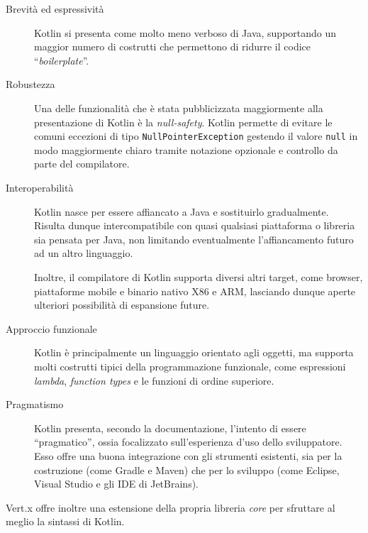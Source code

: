       \begin{description}
        \item[Brevità ed espressività]
          Kotlin si presenta come molto meno verboso di Java, supportando un maggior numero di costrutti che permettono di ridurre il codice ``\emph{boilerplate}''.

        \item[Robustezza]
          Una delle funzionalità che è stata pubblicizzata maggiormente alla presentazione di Kotlin è la \emph{null-safety}.
          Kotlin permette di evitare le comuni eccezioni di tipo \texttt{NullPointerException} gestendo il valore \texttt{null} in modo maggiormente chiaro tramite notazione opzionale e controllo da parte del compilatore.

        \item[Interoperabilità]
          Kotlin nasce per essere affiancato a Java e sostituirlo gradualmente.
          Risulta dunque intercompatibile con quasi qualsiasi piattaforma o libreria sia pensata per Java, non limitando eventualmente l'affiancamento futuro ad un altro linguaggio.

          Inoltre, il compilatore di Kotlin supporta diversi altri target, come browser, piattaforme mobile e binario nativo X86 e ARM, lasciando dunque aperte ulteriori possibilità di espansione future.

        \item[Approccio funzionale]
          Kotlin è principalmente un linguaggio orientato agli oggetti, ma supporta molti costrutti tipici della programmazione funzionale, come espressioni \emph{lambda}, \emph{function types} e le funzioni di ordine superiore.


        \item[Pragmatismo]
          Kotlin presenta, secondo la documentazione, l'intento di essere ``pragmatico'', ossia focalizzato sull'esperienza d'uso dello sviluppatore.
          Esso offre una buona integrazione con gli strumenti esistenti, sia per la costruzione (come Gradle e Maven) che per lo sviluppo (come Eclipse, Visual Studio e gli IDE di JetBrains).
      \end{description}

      Vert.x offre inoltre una estensione della propria libreria \emph{core} per sfruttare al meglio la sintassi di Kotlin.

